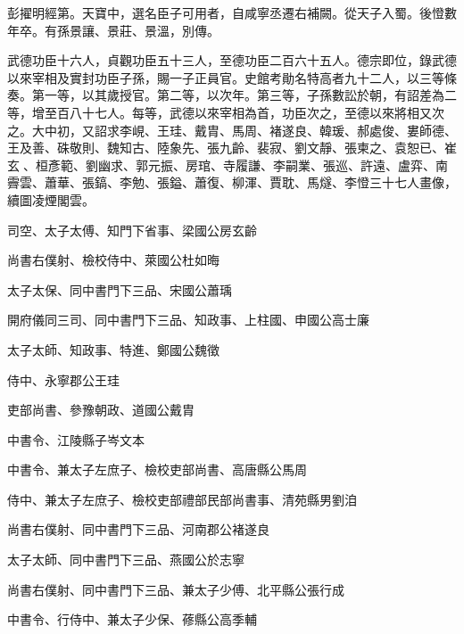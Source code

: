\begin{pinyinscope}
 彭擢明經第。天寶中，選名臣子可用者，自咸寧丞遷右補闕。從天子入蜀。後憕數年卒。有孫景讓、景莊、景溫，別傳。



 武德功臣十六人，貞觀功臣五十三人，至德功臣二百六十五人。德宗即位，錄武德以來宰相及實封功臣子孫，賜一子正員官。史館考勛名特高者九十二人，以三等條奏。第一等，以其歲授官。第二等，以次年。第三等，子孫數訟於朝，有詔差為二等，增至百八十七人。每等，武德以來宰相為首，功臣次之，至德以來將相又次之。大中初，又詔求李峴、王珪、戴胄、馬周、褚遂良、韓瑗、郝處俊、婁師德、王及善、硃敬則、魏知古、陸象先、張九齡、裴寂、劉文靜、張柬之、袁恕已、崔玄、桓彥範、劉幽求、郭元振、房琯、寺履謙、李嗣業、張巡、許遠、盧弈、南霽雲、蕭華、張鎬、李勉、張鎰、蕭復、柳渾、賈耽、馬燧、李憕三十七人畫像，續圖凌煙閣雲。



 司空、太子太傅、知門下省事、梁國公房玄齡



 尚書右僕射、檢校侍中、萊國公杜如晦



 太子太保、同中書門下三品、宋國公蕭瑀



 開府儀同三司、同中書門下三品、知政事、上柱國、申國公高士廉



 太子太師、知政事、特進、鄭國公魏徵



 侍中、永寧郡公王珪



 吏部尚書、參豫朝政、道國公戴胄



 中書令、江陵縣子岑文本



 中書令、兼太子左庶子、檢校吏部尚書、高唐縣公馬周



 侍中、兼太子左庶子、檢校吏部禮部民部尚書事、清苑縣男劉洎



 尚書右僕射、同中書門下三品、河南郡公褚遂良



 太子太師、同中書門下三品、燕國公於志寧



 尚書右僕射、同中書門下三品、兼太子少傅、北平縣公張行成



 中書令、行侍中、兼太子少保、蓚縣公高季輔




\end{pinyinscope}
